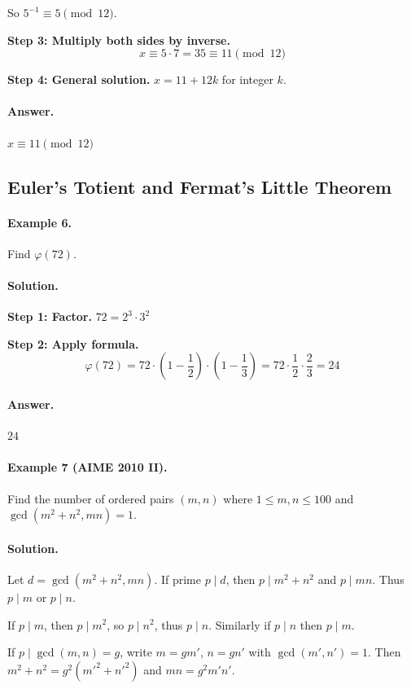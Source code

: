 \documentclass[12pt]{extarticle}
\begin{document}
So $5^{-1} \equiv 5 \pmod{12}$.

\textbf{Step 3: Multiply both sides by inverse.}
\[
x \equiv 5 \cdot 7 = 35 \equiv 11 \pmod{12}
\]

\textbf{Step 4: General solution.} $x = 11 + 12k$ for integer $k$.

\paragraph{Answer.} $\boxed{x \equiv 11 \pmod{12}}$

\subsection{Euler's Totient and Fermat's Little Theorem}

\paragraph{Example 6.} Find $\varphi(72)$.

\paragraph{Solution.}
\textbf{Step 1: Factor.} $72 = 2^3 \cdot 3^2$

\textbf{Step 2: Apply formula.}
\[
\varphi(72) = 72 \cdot \left(1-\frac{1}{2}\right) \cdot \left(1-\frac{1}{3}\right) = 72 \cdot \frac{1}{2} \cdot \frac{2}{3} = 24
\]

\paragraph{Answer.} $\boxed{24}$

\paragraph{Example 7 (AIME 2010 II).} Find the number of ordered pairs $(m,n)$ where $1\le m,n\le 100$ and $\gcd(m^2+n^2,mn)=1$.

\paragraph{Solution.}
Let $d=\gcd(m^2+n^2,mn)$. If prime $p\mid d$, then $p\mid m^2+n^2$ and $p\mid mn$. Thus $p\mid m$ or $p\mid n$.

If $p\mid m$, then $p\mid m^2$, so $p\mid n^2$, thus $p\mid n$. Similarly if $p\mid n$ then $p\mid m$.

If $p\mid\gcd(m,n)=g$, write $m=gm'$, $n=gn'$ with $\gcd(m',n')=1$. Then $m^2+n^2=g^2(m'^2+n'^2)$ and $mn=g^2m'n'$.
\end{document}
